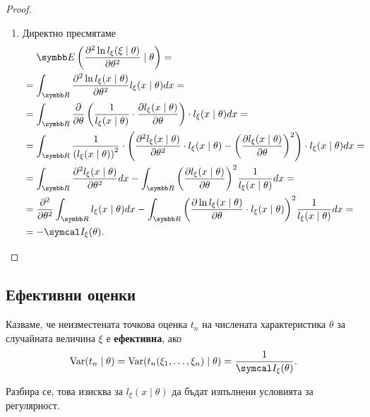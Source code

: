 \documentclass[numbers=endperiod, bibliography=totocnumbered]{scrartcl}
\begin{document}
\begin{proof}
\begin{enumerate}
    \item Директно пресмятаме
    \begin{align*}
      &~~~~\Expect\left( \frac {\partial^2 \ln l_\xi(\xi \mid \theta)} {\partial \theta^2} \mid \theta \right)
      = \\ &=
      \int_{\R} \frac {\partial^2 \ln l_\xi(x \mid \theta)} {\partial \theta^2} l_\xi(x \mid \theta) dx
      = \\ &=
      \int_{\R} \frac \partial {\partial \theta} \left(\frac 1 {l_\xi(x \mid \theta)} \cdot \frac {\partial l_\xi(x \mid \theta)} {\partial \theta} \right) \cdot l_\xi(x \mid \theta) dx
      = \\ &=
      \int_{\R} \frac 1 {{(l_\xi(x \mid \theta))}^2} \cdot \left( \frac {\partial^2 l_\xi(x \mid \theta)} {\partial \theta^2} \cdot l_\xi(x \mid \theta) - {\left(\frac {\partial l_\xi(x \mid \theta)} {\partial \theta} \right)}^2 \right) \cdot l_\xi(x \mid \theta) dx
      = \\ &=
      \int_{\R} \frac {\partial^2 l_\xi(x \mid \theta)} {\partial \theta^2} dx - \int_{\R} {\left(\frac {\partial l_\xi(x \mid \theta)} {\partial \theta} \right)}^2 \frac 1 {l_\xi(x \mid \theta)} dx
      = \\ &=
      \frac {\partial^2} {\partial \theta^2} \int_{\R} l_\xi(x \mid \theta) dx - \int_{\R} {\left(\frac {\partial \ln l_\xi(x \mid \theta)} {\partial \theta} \cdot l_\xi(x \mid \theta) \right)}^2 \frac 1 {l_\xi(x \mid \theta)} dx
      = \\ &=
      -\FisherInfo_\xi(\theta).
    \end{align*}
  \end{enumerate}
\end{proof}

\subsection{Ефективни оценки}

\begin{definition}
  Казваме, че неизместената точкова оценка \( t_n \) на числената характеристика \( \theta \) за случайната величина \( \xi \) е \textbf{ефективна}, ако
  \begin{align*}
    \Var(t_n \mid \theta) = \Var(t_n(\xi_1, \ldots, \xi_n) \mid \theta) = \frac 1 {\FisherInfo_\xi(\theta)}.
  \end{align*}

  Разбира се, това изисква за \( l_\xi(x \mid \theta) \) да бъдат изпълнени условията за регулярност.
\end{definition}
\end{document}
